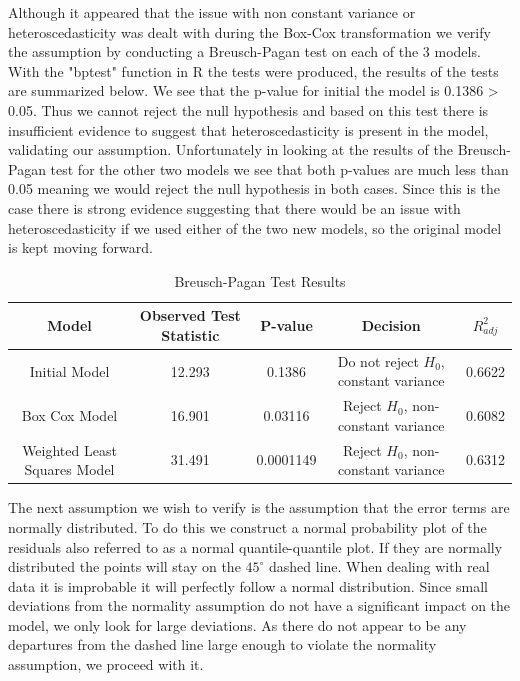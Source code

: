 \documentclass[12pt]{report}
\begin{document}
Although it appeared that the issue with non constant variance or heteroscedasticity was dealt with during the Box-Cox transformation we verify the assumption by conducting a Breusch-Pagan test on each of the 3 models. With the "bptest" function in R the tests were produced, the results of the tests are summarized below. We see that the p-value for initial the model is 0.1386 > 0.05. Thus we cannot reject the null hypothesis and based on this test there is insufficient evidence to suggest that heteroscedasticity is present in the model, validating our assumption. Unfortunately in looking at the results of the Breusch-Pagan test for the other two models we see that both p-values are much less than 0.05 meaning we would reject the null hypothesis in both cases. Since this is the case there is strong evidence suggesting that there would be an issue with heteroscedasticity if we used either of the two new models, so the original model is kept moving forward.

\begin{table}[H] 
\caption{Breusch-Pagan Test Results} \label{tab:BPtest}
\centering
\begin{adjustbox}{width=0.9\textwidth}
\small
\begin{tabular}{|c|c|c|c|c|}
\hline
{\textbf{Model}} & {\textbf{Observed Test Statistic}} & {\textbf{P-value}} & {\textbf{Decision}} & {\textbf{$R^{2}_{adj}$}} \\ \hline
Initial Model     & 12.293  & 0.1386           & Do not reject $H_{0}$, constant variance & 0.6622 \\ \hline
Box Cox Model     & 16.901 & 0.03116           & Reject $H_{0}$, non-constant variance & 0.6082  \\ \hline
Weighted Least Squares Model     & 31.491 & 0.0001149           & Reject $H_{0}$, non-constant variance & 0.6312  \\ \hline
\end{tabular}
\end{adjustbox}
\end{table}
\noindent

The next assumption we wish to verify is the assumption that the error terms are normally distributed. To do this we construct a normal probability plot of the residuals also referred to as a normal quantile-quantile plot. If they are normally distributed the points will stay on the $45^{\circ}$ dashed line. When dealing with real data it is improbable it will perfectly follow a normal distribution. Since small deviations from the normality assumption do not have a significant impact on the model, we only look for large deviations. As there do not appear to be any departures from the dashed line large enough to violate the normality assumption, we proceed with it. 
\end{document}
